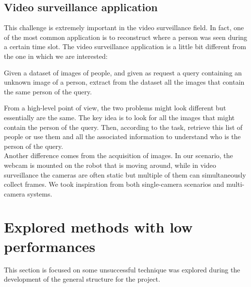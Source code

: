 \subsection{Video surveillance application}
This challenge is extremely important in the video surveillance field. In fact, one of the most common application is to reconstruct where a person was seen during a certain time slot. The video surveillance application is a little bit different from the one in which we are interested:
\begin{tcolorbox}
	\begin{center}
		Given a dataset of images of people, and given as request a query containing an unknown image of a person, extract from the dataset all the images that contain the same person of the query.
	\end{center}
\end{tcolorbox}
From a high-level point of view, the two problems might look different but essentially are the same. The key idea is to look for all the images that might contain the person of the query. Then, according to the task, retrieve this list of people or use them and all the associated information to understand who is the person of the query.\\
Another difference comes from the acquisition of images. In our scenario, the webcam is mounted on the robot that is moving around, while in video surveillance the cameras are often static but multiple of them can simultaneously collect frames. We took inspiration from both single-camera scenarios\cite{reID_withSSN} and multi-camera systems\cite{multiFeatures_reID}.


\section{Explored methods with low performances}
This section is focused on some unsuccessful technique was explored during the development of the general structure for the project.

